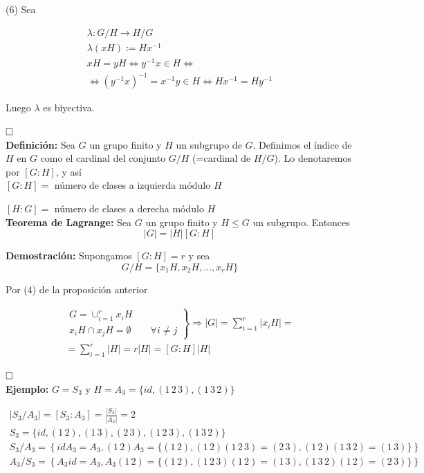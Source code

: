 \documentclass{article}
\begin{document}
(6) Sea 

\begin{gather*}
\lambda:G/H\rightarrow H/G \\
\lambda(xH):=Hx^{-1} \\
xH=yH\Leftrightarrow y^{-1}x\in H \Leftrightarrow \\
\Leftrightarrow (y^{-1}x)^{-1}=x^{-1}y\in H \Leftrightarrow Hx^{-1}=Hy^{-1}
\end{gather*}

Luego $\lambda$ es biyectiva.

$\hfill\square$ \\

\textbf{Definición:} Sea $G$ un grupo finito y $H$ un subgrupo de $G$. Definimos el índice de $H$ en $G$ como el cardinal del conjunto $G/H$ (=cardinal de $H/G$). Lo denotaremos por $\left[G:H\right]$, y así \\

$\left[G:H\right]=$ número de clases a izquierda módulo $H$ 

$\left[H:G\right]=$ número de clases a derecha módulo $H$ \\

\textbf{Teorema de Lagrange:} Sea $G$ un grupo finito y $H\leq G$ un subgrupo. Entonces
\begin{equation*}
|G|=|H|\left[G:H\right]
\end{equation*}

\textbf{Demostración:} Supongamos $\left[G:H\right]=r$ y sea
\begin{equation*}
G/H=\{x_1H,x_2H,\ldots,x_rH\}
\end{equation*}

Por (4) de la proposición anterior

\begin{gather*}
\left. \begin{array}{c}
G=\cup_{i=1}^r x_iH \\
x_iH\cap x_jH=\emptyset \qquad \forall i\neq j
\end{array} \right\rbrace \Rightarrow
|G|=\sum_{i=1}^r |x_iH|= \\
=\sum_{i=1}^r |H|=r|H|=\left[G:H\right]|H|
\end{gather*}

$\hfill\square$ \\

\textbf{Ejemplo:} $G=S_3$ y $H=A_3=\{id,(1\,2\,3),(1\,3\,2)\}$

\begin{gather*}
|S_3/A_3|=\left[S_3:A_3\right]=\frac{|S_3|}{|A_3|}=2 \\
S_3=\{id,(1\,2),(1\,3),(2\,3),(1\,2\,3),(1\,3\,2)\} \\
S_3/A_3=\left\lbrace idA_3=A_3,(1\,2)A_3=\{(1\,2),(1\,2)(1\,2\,3)=(2\,3),(1\,2)(1\,3\,2)=(1\,3)\} \right\rbrace \\
A_3/S_3=\left\lbrace A_3id=A_3,A_3(1\,2)=\{(1\,2),(1\,2\,3)(1\,2)=(1\,3),(1\,3\,2)(1\,2)=(2\,3)\}\right\rbrace 
\end{gather*}
\end{document}
